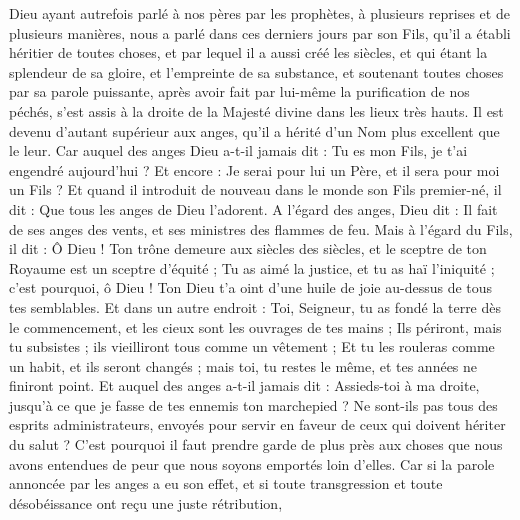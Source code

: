 \begin{multicols}{2}
\VerseOne{}Dieu ayant autrefois parlé à nos pères par les prophètes, à plusieurs reprises et de plusieurs manières,
nous a parlé dans ces derniers jours{} par son Fils, qu'il a établi héritier de toutes choses, et par lequel il a aussi créé les siècles,
et qui étant la splendeur de sa gloire, et l'empreinte de sa substance, et soutenant toutes choses par sa parole puissante, après avoir fait par lui-même la purification de nos péchés, s'est assis à la droite de la Majesté divine dans les lieux très hauts.
Il est devenu d'autant supérieur aux anges, qu'il a hérité d’un Nom plus excellent que le leur.
Car auquel des anges Dieu a-t-il jamais dit : Tu es mon Fils, je t'ai engendré aujourd'hui ? Et encore : Je serai pour lui un Père, et il sera pour moi un Fils{} ?
Et quand il introduit de nouveau dans le monde son Fils premier-né, il dit : Que tous les anges de Dieu l'adorent.
A l’égard des anges, Dieu dit : Il fait de ses anges des vents, et ses ministres des flammes de feu.
Mais à l’égard du Fils, il dit : Ô Dieu ! Ton trône demeure aux siècles des siècles, et le sceptre de ton Royaume est un sceptre d'équité ;
Tu as aimé la justice, et tu as haï l'iniquité ; c'est pourquoi, ô Dieu ! Ton Dieu t'a oint d'une huile de joie au-dessus de tous tes semblables.
Et dans un autre endroit : Toi, Seigneur, tu as fondé la terre dès le commencement, et les cieux sont les ouvrages de tes mains ;
Ils périront, mais tu subsistes ; ils vieilliront tous comme un vêtement ;
Et tu les rouleras comme un habit, et ils seront changés ; mais toi, tu restes le même, et tes années ne finiront point.
Et auquel des anges a-t-il jamais dit : Assieds-toi à ma droite, jusqu'à ce que je fasse de tes ennemis ton marchepied ?
Ne sont-ils pas tous des esprits administrateurs, envoyés pour servir en faveur de ceux qui doivent hériter du salut ?
\VerseOne{}C'est pourquoi il faut prendre garde de plus près aux choses que nous avons entendues de peur que nous soyons emportés loin d’elles.
Car si la parole annoncée par les anges a eu son effet, et si toute transgression et toute désobéissance ont reçu une juste rétribution,

\end{multicols}
